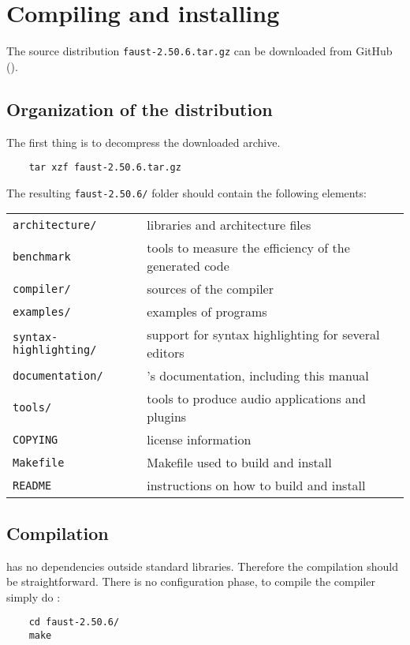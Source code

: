 \chapter{Compiling and installing \faust}
\label{install}


The \faust source distribution \lstinline'faust-2.50.6.tar.gz' can be downloaded from GitHub ().

\section{Organization of the distribution}
The first thing is to decompress the downloaded archive. 
\begin{lstlisting}
	tar xzf faust-2.50.6.tar.gz
\end{lstlisting}

The resulting \lstinline'faust-2.50.6/' folder should contain the following elements:

\begin{tabular}{ll}
	\lstinline'architecture/' 		&\faust libraries and architecture files\\
	\lstinline'benchmark'			&tools to measure the efficiency of the generated code\\
	\lstinline'compiler/'			&sources of the \faust compiler\\
	\lstinline'examples/'			&examples of \faust programs\\
	\lstinline'syntax-highlighting/'&	support for syntax highlighting for several editors\\
	\lstinline'documentation/' 		&\faust's documentation, including this manual\\
	\lstinline'tools/'				&tools to produce audio applications and plugins\\
	\lstinline'COPYING'			&license information\\
	\lstinline'Makefile'			&Makefile used to build and install \faust\\
	\lstinline'README'			&instructions on how to build and install \faust
\end{tabular}

\section{Compilation}
\faust has no dependencies outside standard libraries. Therefore the compilation should be straightforward. There is no configuration phase, to compile the \faust compiler simply do :
\begin{lstlisting}
	cd faust-2.50.6/
	make
\end{lstlisting}

